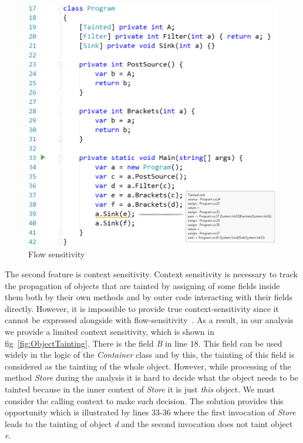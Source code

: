 \begin{figure}[h]
    \includegraphics[width=\linewidth]{screenshots/ReturnsAndBrackets.png}
    \caption{Flow sensitivity}
    \label{fig:ReturnsAndBrackets}
\end{figure}

The second feature is context sensitivity.
Context sensitivity is necessary to track the propagation of objects that are tainted by assigning of some fields inside them both by their own methods and by outer code interacting with their fields directly.
However, it is impossible to provide true context-sensitivity since it cannot be expressed alongside with flow-sensitivity~\cite{Spath:2019:CFF:3302515.3290361}.
As a result, in our analysis we provide a limited context sensitivity, which is shown in fig~\ref{fig:ObjectTainting}.
There is the field \textit{B} in line 18.
This field can be used widely in the logic of the \textit{Container} class and by this, the tainting of this field is considered as the tainting of the whole object.
However, while processing of the method \textit{Store} during the analysis it is hard to decide what the object needs to be tainted because in the inner context of \textit{Store} it is just \textit{this} object.
We must consider the calling context to make such decision.
The solution provides this opportunity which is illustrated by lines 33-36 where the first invocation of \textit{Store} leads to the tainting of object \textit{d} and the second invocation does not taint object \textit{e}.

